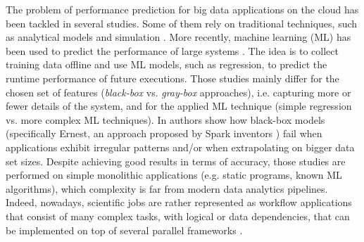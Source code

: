 \documentclass[a4paper, 10pt, conference]{ieeeconf}      %
\begin{document}
The problem of performance prediction for big data applications on the cloud has been tackled in several studies. Some  of them rely on traditional techniques, such as analytical models \cite{lundstrom2004, ardagna1, vianna2013} and simulation \cite{Verma2011}.   More recently, machine learning (ML) has been used to predict the performance of large systems \cite{ernest, pan2017hemingway, alipourfard2017cherrypick, ARDAGNA2019}.
The idea is to collect training data offline and use ML models, such as regression, to predict the runtime performance of future executions.
Those studies mainly differ for the chosen set of features (\textit{black-box} vs. \textit{gray-box} approaches), i.e. capturing more or fewer details of the system,  and for the applied ML technique (simple regression vs. more complex ML techniques). In \cite{ARDAGNA2019} authors show how black-box models (specifically Ernest, an approach proposed by Spark inventors \cite{ernest}) fail when applications exhibit irregular patterns and/or when extrapolating on bigger data set sizes.
Despite achieving good results in terms of accuracy, those studies are performed on simple monolithic applications (e.g. static programs, known ML algorithms), which complexity is far from modern data analytics pipelines.
Indeed, nowadays, scientific jobs are rather represented as workflow applications that consist of many complex tasks, with logical or data dependencies, that can be implemented on top of several parallel frameworks \cite{atkinson2017scientific, warr2012scientific, lordan2014servicess}. 


\end{document}
